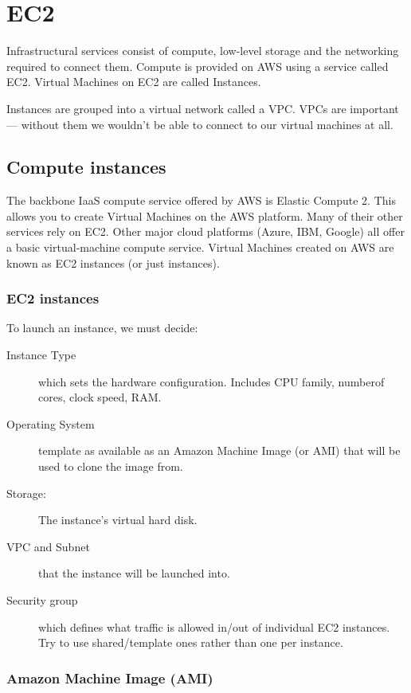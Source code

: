 \chapter{EC2}

Infrastructural services consist of compute, low-level storage and the networking required to connect them.
Compute is provided on AWS using a service called EC2.
Virtual Machines on EC2 are called Instances.

Instances are grouped into a virtual network called a VPC.
VPCs are important --- without them we wouldn't be able to connect to our virtual machines at all.

\section{Compute instances}
\label{sec:compute-instances}

The backbone IaaS compute service offered by AWS is Elastic Compute 2.
This allows you to create Virtual Machines on the AWS platform.
Many of their other services rely on EC2.
Other major cloud platforms (Azure, IBM, Google) all offer a basic virtual-machine compute service.
Virtual Machines created on AWS are known as EC2 instances (or just instances).

\subsection{EC2 instances}
\label{sec:ec2-instances}

To launch an instance, we must decide:

\begin{description}
\item[Instance Type]
  which sets the hardware configuration.
  Includes CPU family, numberof cores, clock speed, RAM.
\item[Operating System]
  template as available as an Amazon Machine Image (or AMI) that will be used to clone the image from.
\item[Storage:]
  The instance's virtual hard disk.
\item[VPC and Subnet]
  that the instance will be launched into.
\item[Security group]
  which defines what traffic is allowed in/out of individual EC2
  instances.
  Try to use shared/template ones rather than one per instance.
\end{description}

\subsection{Amazon Machine Image (AMI)}
\label{sec:amazon-machine-image-ami}

